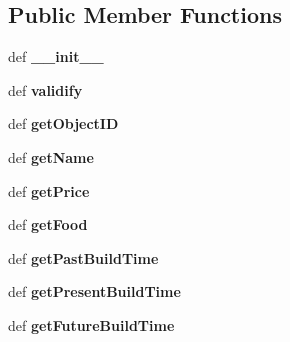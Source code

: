 \subsection*{Public Member Functions}
\begin{CompactItemize}
\item 
\hypertarget{classGameObject_1_1BuildingType_500a56f4566cefd07be88e914817ccbb}{
def \textbf{\_\-\_\-init\_\-\_\-}}
\label{classGameObject_1_1BuildingType_500a56f4566cefd07be88e914817ccbb}

\item 
\hypertarget{classGameObject_1_1BuildingType_f172800dda38b221d18f25a4dc1bbaf2}{
def \textbf{validify}}
\label{classGameObject_1_1BuildingType_f172800dda38b221d18f25a4dc1bbaf2}

\item 
\hypertarget{classGameObject_1_1BuildingType_11c5eb131d0f3f447e6c0f68978d8b08}{
def \textbf{getObjectID}}
\label{classGameObject_1_1BuildingType_11c5eb131d0f3f447e6c0f68978d8b08}

\item 
\hypertarget{classGameObject_1_1BuildingType_a07462a9e55227486613a822582326f7}{
def \textbf{getName}}
\label{classGameObject_1_1BuildingType_a07462a9e55227486613a822582326f7}

\item 
\hypertarget{classGameObject_1_1BuildingType_5d012aa14cbf81b77c48c2856b617b95}{
def \textbf{getPrice}}
\label{classGameObject_1_1BuildingType_5d012aa14cbf81b77c48c2856b617b95}

\item 
\hypertarget{classGameObject_1_1BuildingType_d6161ac34a655b9e027cbcf53e2d8477}{
def \textbf{getFood}}
\label{classGameObject_1_1BuildingType_d6161ac34a655b9e027cbcf53e2d8477}

\item 
\hypertarget{classGameObject_1_1BuildingType_51eefc9f6d5ea5f3ec39613d349c5139}{
def \textbf{getPastBuildTime}}
\label{classGameObject_1_1BuildingType_51eefc9f6d5ea5f3ec39613d349c5139}

\item 
\hypertarget{classGameObject_1_1BuildingType_7766d7ab40b1042155e2e94a54e61349}{
def \textbf{getPresentBuildTime}}
\label{classGameObject_1_1BuildingType_7766d7ab40b1042155e2e94a54e61349}

\item 
\hypertarget{classGameObject_1_1BuildingType_a37c8617bdafd18d84e051d1694c410a}{
def \textbf{getFutureBuildTime}}
\label{classGameObject_1_1BuildingType_a37c8617bdafd18d84e051d1694c410a}


\end{CompactItemize}
